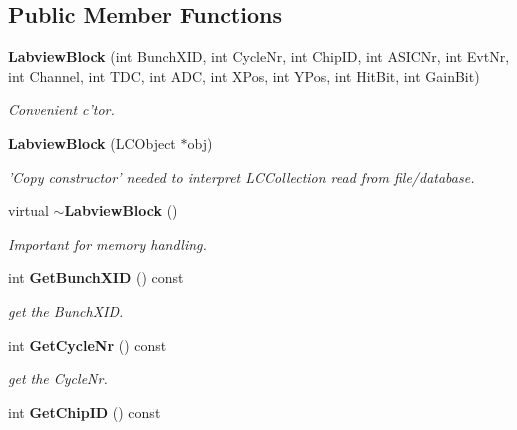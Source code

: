 \subsection*{Public Member Functions}
\begin{DoxyCompactItemize}
\item 
{\bf Labview\-Block} (int Bunch\-X\-I\-D, int Cycle\-Nr, int Chip\-I\-D, int A\-S\-I\-C\-Nr, int Evt\-Nr, int Channel, int T\-D\-C, int A\-D\-C, int X\-Pos, int Y\-Pos, int Hit\-Bit, int Gain\-Bit)\label{classCALICE_1_1LabviewBlock_acadd794d318b2fc9132a20547107c499}

\begin{DoxyCompactList}\small\item\em Convenient c'tor. \end{DoxyCompactList}\item 
{\bf Labview\-Block} (L\-C\-Object $\ast$obj)\label{classCALICE_1_1LabviewBlock_ae8ff897ba24df56660d05a043768cb15}

\begin{DoxyCompactList}\small\item\em 'Copy constructor' needed to interpret L\-C\-Collection read from file/database. \end{DoxyCompactList}\item 
virtual {\bf $\sim$\-Labview\-Block} ()\label{classCALICE_1_1LabviewBlock_af2c2454dec16e14d52fd44545e06f3a9}

\begin{DoxyCompactList}\small\item\em Important for memory handling. \end{DoxyCompactList}\item 
int {\bf Get\-Bunch\-X\-I\-D} () const \label{classCALICE_1_1LabviewBlock_a94583fba9cc6196c89728b850e5f13b5}

\begin{DoxyCompactList}\small\item\em get the Bunch\-X\-I\-D. \end{DoxyCompactList}\item 
int {\bf Get\-Cycle\-Nr} () const \label{classCALICE_1_1LabviewBlock_ae8c915a57a7144c79521a2bd2562e8de}

\begin{DoxyCompactList}\small\item\em get the Cycle\-Nr. \end{DoxyCompactList}\item 
int {\bf Get\-Chip\-I\-D} () const \label{classCALICE_1_1LabviewBlock_a5c14f61678c97e36a4c63717055175b3}


\end{DoxyCompactItemize}
